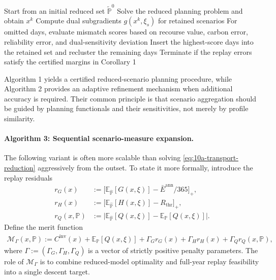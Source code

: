\begin{algorithmic}[1]
\State Start from an initial reduced set \(\widetilde{\mathbb{P}}^0\)
  \State Solve the reduced planning problem and obtain \(x^k\)
  \State Compute dual subgradients \(g(x^k,\xi_s)\) for retained scenarios
  \State For omitted days, evaluate mismatch scores based on recourse value, carbon error, reliability error, and dual-sensitivity deviation
  \State Insert the highest-score days into the retained set and recluster the remaining days
  \State Terminate if the replay errors satisfy the certified margins in Corollary 1
\EndFor
\end{algorithmic}

Algorithm 1 yields a certified reduced-scenario planning procedure, while Algorithm 2 provides an adaptive refinement mechanism when additional accuracy is required. Their common principle is that scenario aggregation should be guided by planning functionals and their sensitivities, not merely by profile similarity.

\paragraph{Algorithm 3: Sequential scenario-measure expansion.}

The following variant is often more scalable than solving \eqref{eq:10a-transport-reduction} aggressively from the outset. To state it more formally, introduce the replay residuals
\begin{align}
r_G(x) &:= \Big[\mathbb{E}_{\widehat{\mathbb{P}}}[G(x,\xi)] - \bar E^{\mathrm{ann}}/365\Big]_+,
\label{eq:10a-replay-carbon-residual}\\
r_H(x) &:= \Big[\mathbb{E}_{\widehat{\mathbb{P}}}[H(x,\xi)] - R_{\mathrm{thr}}\Big]_+,
\label{eq:10a-replay-reliability-residual}\\
r_Q(x,\mathbb{P}) &:= \Big|\mathbb{E}_{\widehat{\mathbb{P}}}[Q(x,\xi)] - \mathbb{E}_{\mathbb{P}}[Q(x,\xi)]\Big|.
\label{eq:10a-replay-value-residual}
\end{align}
Define the merit function
\begin{align}
\mathcal{M}_{\Gamma}(x,\mathbb{P}) := C^{\mathrm{inv}}(x) + \mathbb{E}_{\mathbb{P}}[Q(x,\xi)] + \Gamma_G r_G(x) + \Gamma_H r_H(x) + \Gamma_Q r_Q(x,\mathbb{P}),
\label{eq:10a-merit-function}
\end{align}
where \(\Gamma := (\Gamma_G,\Gamma_H,\Gamma_Q)\) is a vector of strictly positive penalty parameters. The role of \(\mathcal{M}_{\Gamma}\) is to combine reduced-model optimality and full-year replay feasibility into a single descent target.

